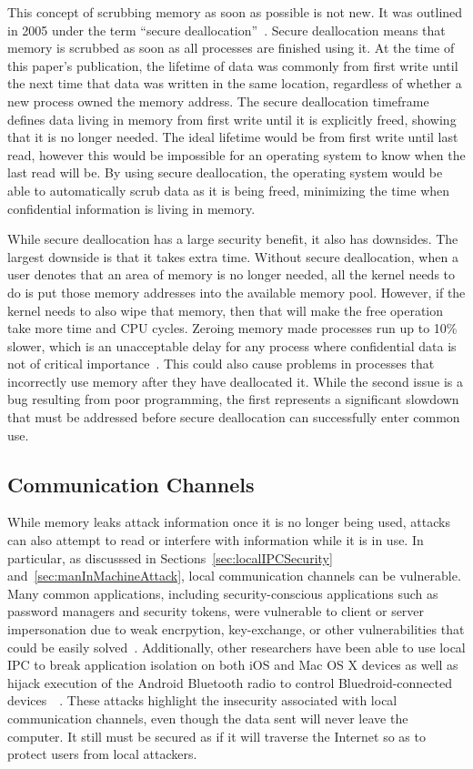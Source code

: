 This concept of scrubbing memory as soon as possible is not new.  It was outlined in 2005 under the term ``secure deallocation''~\cite{chow2005shredding}.  Secure deallocation means that memory is scrubbed as soon as all processes are finished using it.  At the time of this paper's publication, the lifetime of data was commonly from first write until the next time that data was written in the same location, regardless of whether a new process owned the memory address.  The secure deallocation timeframe defines data living in memory from first write until it is explicitly freed, showing that it is no longer needed.  The ideal lifetime would be from first write until last read, however this would be impossible for an operating system to know when the last read will be.  By using secure deallocation, the operating system would be able to automatically scrub data as it is being freed, minimizing the time when confidential information is living in memory.

While secure deallocation has a large security benefit, it also has downsides.  The largest downside is that it takes extra time.  Without secure deallocation, when a user denotes that an area of memory is no longer needed, all the kernel needs to do is put those memory addresses into the available memory pool.  However, if the kernel needs to also wipe that memory, then that will make the free operation take more time and CPU cycles.  Zeroing memory made processes run up to 10\% slower, which is an unacceptable delay for any process where confidential data is not of critical importance~\cite{chow2005shredding}.  This could also cause problems in processes that incorrectly use memory after they have deallocated it.  While the second issue is a bug resulting from poor programming, the first represents a significant slowdown that must be addressed before secure deallocation can successfully enter common use.

\subsection{Communication Channels}
\label{sec:communicationChannels}
While memory leaks attack information once it is no longer being used, attacks can also attempt to read or interfere with information while it is in use.  In particular, as discusssed in Sections~\ref{sec:localIPCSecurity} and~\ref{sec:manInMachineAttack}, local communication channels can be vulnerable.  Many common applications, including security-conscious applications such as password managers and security tokens, were vulnerable to client or server impersonation due to weak encrpytion, key-exchange, or other vulnerabilities that could be easily solved~\cite{MitMa}.  Additionally, other researchers have been able to use local IPC to break application isolation on both iOS and Mac OS X devices as well as hijack execution of the Android Bluetooth radio to control Bluedroid-connected devices~\cite{Xing_2015_CAI_2810103_2813609}~\cite{Shao_2016_MAU_2976749_2978297}.  These attacks highlight the insecurity associated with local communication channels, even though the data sent will never leave the computer.  It still must be secured as if it will traverse the Internet so as to protect users from local attackers.

